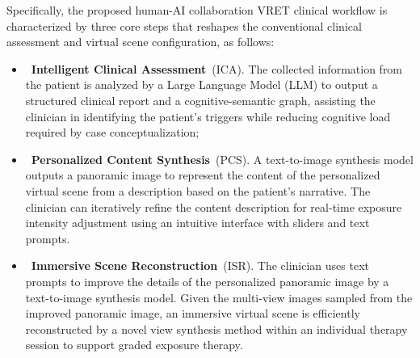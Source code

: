 \documentclass[]{interact}
\newcommand{\stepa}{Intelligent Clinical Assessment}
\newcommand{\stepb}{Personalized Content Synthesis}
\newcommand{\stepc}{Immersive Scene Reconstruction}
\newcommand{\stepas}{ICA}
\newcommand{\stepbs}{PCS}
\newcommand{\stepcs}{ISR}
\begin{document}
Specifically, the proposed human-AI collaboration VRET clinical workflow is characterized by three core steps that reshapes the conventional clinical assessment and virtual scene configuration, as follows: 
\begin{itemize}

\item~\textbf{\stepa}~(\stepas). The collected information from the patient is analyzed by a Large Language Model (LLM) to output a structured clinical report and a cognitive-semantic graph, assisting the clinician in identifying the patient's triggers while reducing cognitive load required by case conceptualization;
    \item~\textbf{\stepb}~(\stepbs). A text-to-image synthesis model outputs a panoramic image to represent the content of the personalized virtual scene from a description based on the patient's narrative. The clinician can iteratively refine the content description for real-time exposure intensity adjustment using an intuitive interface with sliders and text prompts.
    \item~\textbf{\stepc}~(\stepcs). The clinician uses text prompts to improve the details of the personalized panoramic image by a text-to-image synthesis model. Given the multi-view images sampled from the improved panoramic image, an immersive virtual scene is efficiently reconstructed by a novel view synthesis method within an individual therapy session to support graded exposure therapy.
\end{itemize}
\end{document}
